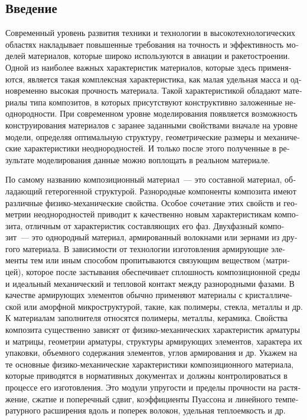 
\begin{russian}
\setcounter{secnumdepth}{-1}
\chapter{Введение}
\setcounter{secnumdepth}{2}

Современный уровень развития техники и технологии в высокотехнологических областях накладывает повышенные требования на точность и эффективность моделей материалов, которые широко используются в авиации и ракетостроении. Одной из наиболее важных характеристик материалов, которые здесь применяются, является такая комплексная характеристика, как малая удельная масса и одновременно высокая прочность материала. Такой характеристикой обладают материалы типа композитов, в которых присутствуют конструктивно заложенные неоднородности. При современном уровне моделирования появляется возможность конструирования материалов с заранее заданными свойствами вначале на уровне модели, определяя оптимальную структуру, геометрические размеры и механические характеристики неоднородностей. И только после этого полученные в результате моделирования данные можно воплощать в реальном материале.

По самому названию композиционный материал~--- это составной материал, обладающий гетерогенной структурой. Разнородные компоненты композита имеют различные физико-механические свойства. Особое сочетание этих свойств и геометрии неоднородностей приводит к качественно новым характеристикам композита, отличным от характеристик составляющих его фаз. Двухфазный композит~--- это однородный материал, армированный волокнами или зернами из другого материала. В зависимости от технологии изготовления армирующие элементы тем или иным способом пропитываются связующим веществом (матрицей), которое после застывания обеспечивает сплошность композиционной среды и идеальный механический и тепловой контакт между разнородными фазами. В качестве армирующих элементов обычно применяют материалы с кристаллической или аморфной микроструктурой, такие, как полимеры, стекла, металлы и др. К материалам заполнителя относятся полимеры, металлы, керамика. Свойства композита существенно зависят от физико-механических характеристик арматуры и матрицы, геометрии арматуры, структуры армирующих элементов, характера их упаковки, объемного содержания элементов, углов армирования и др. Укажем на те основные физико-механические характеристики композиционного материала, которые приводятся в нормативных документах и должны контролироваться в процессе его изготовления. Это модули упругости и пределы прочности на растяжение, сжатие и поперечный сдвиг, коэффициенты Пуассона и линейного температурного расширения вдоль и поперек волокон, удельная теплоемкость и др.{\sloppy\par}


\end{russian}
